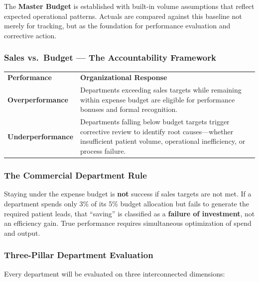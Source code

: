 \documentclass[11pt,a4paper]{article}
\begin{document}
The \textbf{Master Budget} is established with built-in volume assumptions that reflect
expected operational patterns. Actuals are compared against this baseline not merely for
tracking, but as the foundation for performance evaluation and corrective action.

\subsubsection{Sales vs.\ Budget --- The Accountability Framework}

\begin{center}
\begin{tabularx}{0.92\linewidth}{L{3.5cm} X}
  \color{white}\textbf{Performance} & \color{white}\textbf{Organizational Response} \\
  \textbf{Overperformance} &
    Departments exceeding sales targets while remaining within expense budget are eligible
    for performance bonuses and formal recognition. \\
  \textbf{Underperformance} &
    Departments falling below budget targets trigger corrective review to identify root
    causes---whether insufficient patient volume, operational inefficiency, or process failure. \\
\end{tabularx}
\end{center}

\subsubsection{The Commercial Department Rule}

Staying under the expense budget is \textbf{not} success if sales targets are not met.
If a department spends only 3\% of its 5\% budget allocation but fails to generate the
required patient leads, that ``saving'' is classified as a \textbf{failure of investment},
not an efficiency gain. True performance requires simultaneous optimization of spend and output.

\subsubsection{Three-Pillar Department Evaluation}

Every department will be evaluated on three interconnected dimensions:
\end{document}
